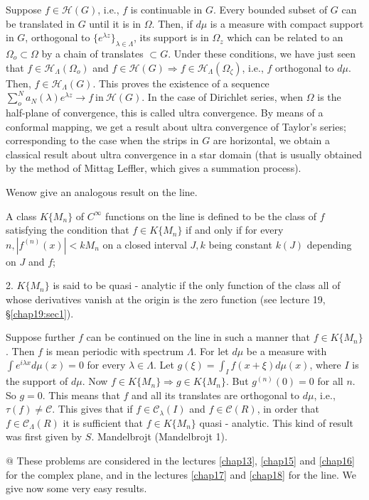 Suppose $f \in \mathscr{H}(G)$, i.e., $f$
 is continuable in $G$. Every bounded subset of $G$ can be translated
 in $G$ until it is in $\Omega$. Then, if $d \mu$ is a measure with
 compact support in $G$, orthogonal to $\{e^{\lambda z} \}_{\lambda
 \in \Lambda}$, its support is in $\Omega_z$ which can be related to
 an $\Omega_o \subset \Omega$ by a chain of translates $\subset
 G$. Under these conditions, we have just seen that $f \in
 \mathscr{H}_{\Lambda}(\Omega_o)$ and $f \in \mathscr{H}(G)
 \Rightarrow f \in \mathscr{H}_{\Lambda}(\Omega_{\zeta})$, i.e., $f$
 orthogonal to $d \mu $. Then, $f \in \mathscr{H}_{\Lambda}(G)$. This
 proves the existence of a sequence $\sum \limits^N_{o} a_N (\lambda)
 e^{\lambda z} \rightarrow f ~\text{in}~ \mathscr{H}(G)$. In the case of
 Dirichlet series, when $\Omega$ is the half-plane of convergence,
 this is called ultra convergence. By means of a conformal mapping, we
 get a result about ultra convergence of Taylor's series;
 corresponding to the case when the strips in $G$ are horizontal, we
 obtain a classical result about ultra convergence in a star domain
 (that is usually obtained by the method of Mittag Leffler, which
 gives a summation process). 
 
 We\pageoriginale now give an analogous result on the line.
 
\begin{defi*}%
 A class $K \{ M_n\}$ of $C^{\infty}$ functions on the line is
 defined to be the class of $f$ satisfying the condition that $f \in
 K \{ M_n \}$ if and only if for every $n, |f^{(n)} (x)| < k M_n $ on a
 closed interval $J, k$ being constant $k(J)$ depending on $J$ and
 $f$; 
 \end{defi*} 
2. $K \{M_n \}$ is said to be quasi - analytic if the only function
of the class all of whose derivatives vanish at the origin is the zero
function (see lecture 19, \S \ref{chap19:sec1}). 

Suppose further $f$ can be continued on the line in such a manner that
$f \in K\{ M_n\}$. Then $f$ is mean periodic with spectrum
$\Lambda$. For let $d \mu$ be a measure with $\int e^{i \lambda x}
d\mu(x) = 0$ for every $\lambda \in \Lambda$. Let $g (\xi) = \int_I
f(x + \xi) d\mu (x)$, where $I$ is the support of $d \mu$. Now $f \in
K \{ M_n\} \Rightarrow g \in K \{ M_n\}$. But $g^{(n)} (0) = 0$ for
all $n$. So $g = 0$. This means that $f$ and all its translates are
orthogonal to $d \mu$, i.e., $\tau (f) \neq \mathscr{C}$. This gives
that if $f \in \mathscr{C}_\lambda (I)$ and $f \in \mathscr{C}(R)$, in
order that $f \in \mathscr{C}_{\Lambda}(R)$ it is sufficient that $f
\in K \{ M_n\}$ quasi - analytic. This kind of result was first given
by $S$. Mandelbrojt (Mandelbrojt 1). 

\noindent
$@$ These problems are considered in the lectures \ref{chap13},
\ref{chap15} and \ref{chap16}
for the complex plane, and in the lectures \ref{chap17} and \ref{chap18} for the
line. We give now some very easy results. 
